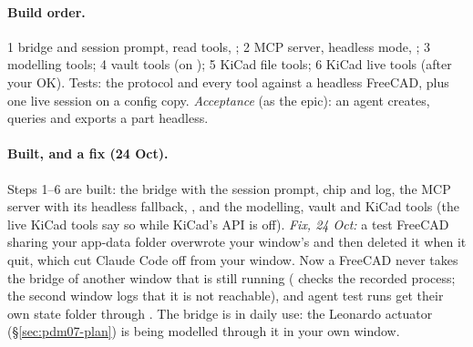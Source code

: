 \paragraph{Build order.} 1 bridge and session prompt, read tools, ; 2 MCP server, headless mode,
; 3 modelling tools; 4 vault tools (on ); 5 KiCad file tools; 6 KiCad
live tools (after your OK). Tests: the protocol and every tool against a headless FreeCAD, plus one live session
on a config copy. \emph{Acceptance} (as the epic): an agent creates, queries and exports a part headless.

\paragraph{Built, and a fix (24 Oct).} Steps 1--6 are built: the bridge with the session prompt, chip and log, the
MCP server with its headless fallback, , and the modelling, vault and KiCad tools (the live KiCad
tools say so while KiCad's API is off). \emph{Fix, 24 Oct:} a test FreeCAD sharing your app-data folder overwrote your window's
 and then deleted it when it quit, which cut Claude Code off from your window. Now a FreeCAD never
takes the bridge of another window that is still running ( checks the recorded process; the
second window logs that it is not reachable), and agent test runs get their own state folder through
. The bridge is in daily use: the Leonardo actuator (\S\ref{sec:pdm07-plan}) is being modelled
through it in your own window.
